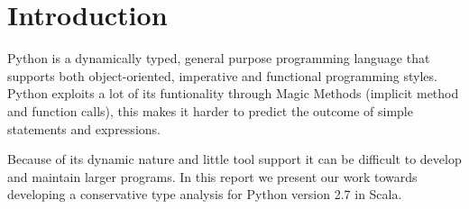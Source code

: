 \chapter{Introduction}
Python is a dynamically typed, general purpose programming language that supports both object-oriented, imperative and functional programming styles. 
Python exploits a lot of its funtionality through Magic Methods (implicit method and function calls), 
this makes it harder to predict the outcome of simple statements and expressions. 

Because of its dynamic nature and little tool support it can be difficult to develop and maintain larger programs. 
In this report we present our work towards developing a conservative type analysis for Python version 2.7 in Scala.
